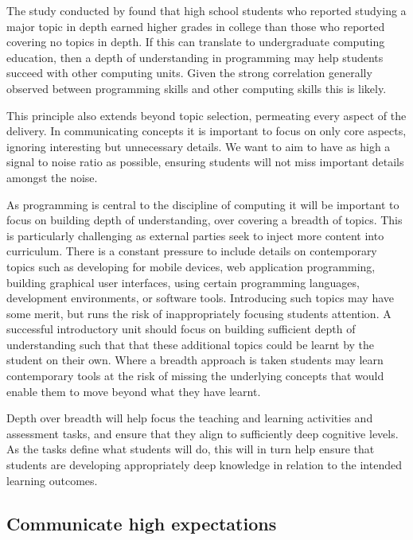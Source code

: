 The study conducted by \citet{Schwartz:2009} found that high school students who reported studying a major topic in depth earned higher grades in college than those who reported covering no topics in depth. If this can translate to undergraduate computing education, then a depth of understanding in programming may help students succeed with other computing units. Given the strong correlation generally observed between programming skills and other computing skills \cite{McGettrick:2005} this is likely.

This principle also extends beyond topic selection, permeating every aspect of the delivery. In communicating concepts it is important to focus on only core aspects, ignoring interesting but unnecessary details. We want to aim to have as high a signal to noise ratio \cite{Shannon:1949} as possible, ensuring students will not miss important details amongst the noise.

As programming is central to the discipline of computing \cite{McGettrick:2005} it will be important to focus on building depth of understanding, over covering a breadth of topics. This is particularly challenging as external parties seek to inject more content into curriculum. There is a constant pressure to include details on contemporary topics such as developing for mobile devices, web application programming, building graphical user interfaces, using certain programming languages, development environments, or software tools. Introducing such topics may have some merit, but runs the risk of inappropriately focusing students attention. A successful introductory unit should focus on building sufficient depth of understanding such that that these additional topics could be learnt by the student on their own. Where a breadth approach is taken students may learn contemporary tools at the risk of missing the underlying concepts that would enable them to move beyond what they have learnt.

Depth over breadth will help focus the teaching and learning activities and assessment tasks, and ensure that they align to sufficiently deep cognitive levels. As the tasks define what students will do, this will in turn help ensure that students are developing appropriately deep knowledge in relation to the intended learning outcomes.


\subsection{Communicate high expectations} %
\label{ssub:have_high_expectations_of_students_}

